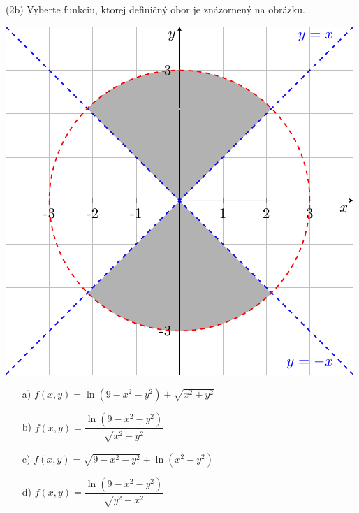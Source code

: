 \pr (2b) Vyberte funkciu, ktorej definičný obor je znázornený na obrázku.
\begin{multicols}{2}
\noindent
\includegraphics{kruznica3.pdf}

\noindent
\begin{itemize}
\item[a)] $\displaystyle f(x,y)= \ln{(9-x^2-y^2)}+\sqrt{x^2+y^2}$
\item[b)] $\displaystyle f(x,y)= \dfrac{\ln(9-x^2-y^2)}{\sqrt{x^2-y^2}}$
\item[c)] $\displaystyle f(x,y)= \sqrt{9-x^2-y^2}+\ln{(x^2-y^2)}$
\item[d)] $\displaystyle f(x,y)= \dfrac{\ln(9-x^2-y^2)}{\sqrt{y^2-x^2}}$
\end{itemize}
\end{multicols}
